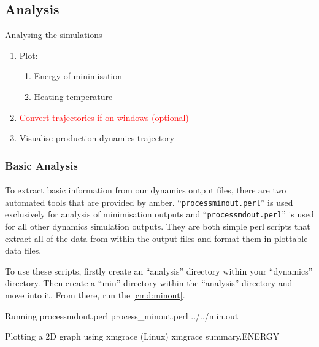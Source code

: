 \subsection{Analysis}
    \begin{task}[label=task:Analysis]{Analysing the simulations}
        \begin{enumerate}[label=(\alph*)]
            \item Plot:
            \begin{enumerate}[label=(\roman*)]
                \item Energy of minimisation
                \item Heating temperature
            \end{enumerate}
            \item \textcolor{Red}{Convert trajectories if on windows (optional)}
            \item Visualise production dynamics trajectory
        \end{enumerate}
    \end{task}


    \subsubsection{Basic Analysis}
    \paragraph{}
        To extract basic information from our dynamics output files, there are two automated tools that are provided by amber. \enquote{\texttt{process\textunderscore minout.perl}} is used exclusively for analysis of minimisation outputs and \enquote{\texttt{process\textunderscore mdout.perl}} is used for all other dynamics simulation outputs. They are both simple perl scripts that extract all of the data from within the output files and format them in plottable data files.

        To use these scripts, firstly create an \enquote{analysis} directory within your \enquote{dynamics} directory. Then create a \enquote{min} directory within the \enquote{analysis} directory and move into it. From there, run the \cref{cmd:minout}.

    \begin{bashcmd}[label=cmd:minout]{Running process\textunderscore mdout.perl}
    process_minout.perl ../../min.out
    \end{bashcmd}

    \begin{bashcmd}[label=cmd:xmgrace]{Plotting a 2D graph using xmgrace (Linux)}
        xmgrace summary.ENERGY
    \end{bashcmd}

